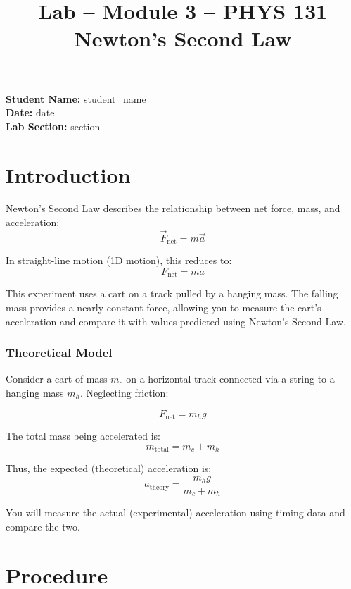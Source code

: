 \documentclass[12pt]{article}
\begin{document}
\title{Lab -- Module 3 -- PHYS 131\\[0.5em]Newton's Second Law}
\date{}
\maketitle

\textbf{Student Name:} {{ student_name }}\\
\textbf{Date:} {{ date }}\\
\textbf{Lab Section:} {{ section }}\\[1em]

\section*{Introduction}

Newton's Second Law describes the relationship between net force, mass, and acceleration:
\[
\vec{F}_{\text{net}} = m \vec{a}
\]

In straight-line motion (1D motion), this reduces to:
\[
F_{\text{net}} = ma
\]

This experiment uses a cart on a track pulled by a hanging mass. The falling mass provides a nearly constant force, allowing you to measure the cart's acceleration and compare it with values predicted using Newton's Second Law.

\subsubsection*{Theoretical Model}

Consider a cart of mass $m_c$ on a horizontal track connected via a string to a hanging mass $m_h$. Neglecting friction:

\[
F_{\text{net}} = m_h g
\]

The total mass being accelerated is:
\[
m_{\text{total}} = m_c + m_h
\]

Thus, the expected (theoretical) acceleration is:
\[
a_{\text{theory}} = \frac{m_h g}{m_c + m_h}
\]

You will measure the actual (experimental) acceleration using timing data and compare the two.

\section*{Procedure}
\end{document}
